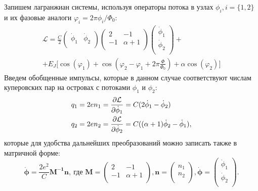 Запишем лагранжиан системы, используя операторы потока в узлах $\phi_i, i=\{1,2\}$ и их фазовые аналоги $\varphi_i=2\pi\phi_i/\Phi_0$:
\begin{multline}\label{eq: Lagr_flux}
{\mathcal{L}} = \frac{C}{2}
\begin{pmatrix}\dot{\phi}_1 &\dot{\phi}_2\\
	\end{pmatrix}
\begin{pmatrix}
	2 & -1\\ 
	-1 & \alpha+1 \\
\end{pmatrix}
\begin{pmatrix}\dot{\phi}_1\\\dot{\phi}_2\\\end{pmatrix}
 + \\ + E_J\Big[ \cos(\varphi_1)+\cos(\varphi_2-\varphi_1+2\pi\frac{\Phi}{\Phi_0})+\alpha\cos(\varphi_2)\Big] 
\end{multline}
Введем обобщенные импульсы, которые в данном случае соответствуют числам куперовских пар на островах с потоками $\phi_1$ и $\phi_2$: 
\begin{equation}
\centering
\begin{aligned}
q_1 = 2en_1 & = \frac{\partial\mathcal{L}}{\partial\dot{\phi}_1} = {C}(2\dot{\phi}_1-\dot{\phi}_2) \\
q_2 = 2en_2 & = \frac{\partial\mathcal{L}}{\partial\dot{\phi}_2} = {C}((\alpha+1)\dot{\phi}_2-\dot{\phi}_1),
\end{aligned}
\end{equation}
которые для удобства дальнейших преобразований можно записать также в матричной форме: 
\begin{equation}
\mathbf{\dot{\boldsymbol{\phi}}} = \frac{2e^2}{C}\mathbf{M^{-1}}\mathbf{n},\ \text{где } \mathbf{M}=\begin{pmatrix}
2 & -1\\ 
-1 & \alpha+1 \\
\end{pmatrix}, \mathbf{n} = \begin{pmatrix}n_1\\n_2\\\end{pmatrix}, 
\mathbf{\dot{\boldsymbol{\phi}}} = \begin{pmatrix}\dot{\phi}_1\\\dot{\phi}_2\\\end{pmatrix}.
\end{equation}
